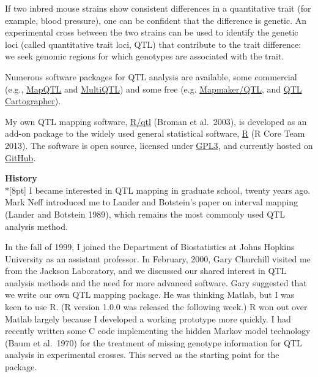 \documentclass[letterpaper]{article}
\begin{document}
\begin{multicols}{2}
If two inbred mouse strains show consistent differences in a
quantitative trait (for example, blood pressure), one can be confident
that the difference is genetic. An experimental cross between the two
strains can be used to identify the genetic loci (called quantitative
trait loci, QTL) that contribute to the trait difference: we seek
genomic regions for which genotypes are associated with the trait.

Numerous software packages for QTL analysis are available, some
commercial (e.g.,
\href{http://www.kyazma.nl/index.php/mc.MapQTL}{MapQTL} and
\href{http://www.multiqtl.com}{MultiQTL}) and some free
(e.g. \href{http://www.broadinstitute.org/ftp/distribution/software/mapmaker3}{Mapmaker/QTL},
and \href{http://statgen.ncsu.edu/qtlcart/index.php}{QTL
Cartographer}).

My own QTL mapping software, \href{http://www.rqtl.org}{R/qtl} (Broman
et al.\ 2003), is developed as an add-on package to the widely used
general statistical software, \href{http://www.r-project.org}{R} (R
Core Team 2013). The software is open source, licensed under
\href{http://www.gnu.org/licenses/gpl.html}{GPL3}, and currently
hosted on \href{http://github.com/kbroman/qtl.git}{GitHub}.




\bigskip
{}
\noindent \textbf{\sffamily History}\\*[8pt]
I became interested in QTL mapping in graduate school, twenty years ago.
Mark Neff introduced me to Lander and Botstein's
paper on interval mapping (Lander and Botstein 1989), which remains
the most commonly used QTL analysis method.

In the fall of 1999, I joined the Department of Biostatistics at Johns
Hopkins University as an assistant professor. In February, 2000, Gary
Churchill visited me from the Jackson Laboratory, and we discussed our
shared interest in QTL analysis methods and the need for more advanced
software. Gary suggested that we write our own QTL mapping package. He
was thinking Matlab, but I was keen to use R. (R version 1.0.0 was
released the following week.) R won out over Matlab largely because I
developed a working prototype more quickly. I had recently written
some C code implementing the hidden Markov model technology (Baum et
al.\ 1970) for the treatment of missing genotype information for QTL
analysis in experimental crosses.  This served as the starting point
for the package.


\end{multicols}
\end{document}
